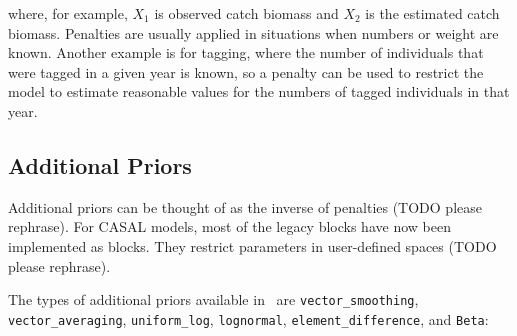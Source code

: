 where, for example, $X_1$ is observed catch biomass and $X_2$ is the estimated catch biomass. Penalties are usually applied in situations when numbers or weight are known. Another example is for tagging, where the number of individuals that were tagged in a given year is known, so a penalty can be used to restrict the model to estimate reasonable values for the numbers of tagged individuals in that year.

\subsection{Additional Priors\label{sec:additional_priors}}

Additional priors can be thought of as the inverse of penalties (TODO please rephrase). For CASAL models, most of the legacy  blocks have now been implemented as  blocks. They restrict parameters in user-defined spaces (TODO please rephrase).

The types of additional priors available in \CNAME\ are \texttt{vector\_smoothing}, \texttt{vector\_averaging}, \texttt{uniform\_log}, \texttt{lognormal}, \texttt{element\_difference}, and \texttt{Beta}:

